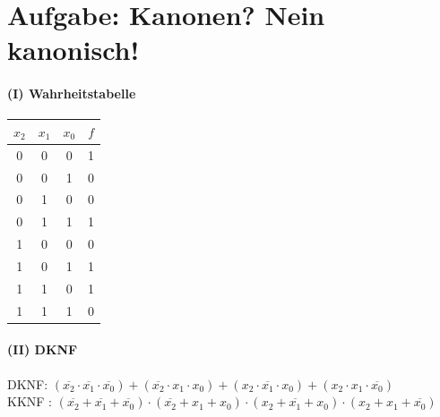 \documentclass[a4paper]{article}
\begin{document}
\section{Aufgabe: Kanonen? Nein kanonisch!}
\paragraph{(I) Wahrheitstabelle}
\begin{center}
\begin{tabular}{ c c c |c }
	$x_2$ & $x_1$ & $x_0$ & $f$\\
	\hline
	0& 0& 0 & 1\\ 
	0 & 0 & 1 & 0\\
	0 & 1 & 0 & 0\\
	0 & 1 & 1 & 1\\
	1 & 0 & 0 & 0\\
	1 & 0 & 1 & 1\\
	1 & 1 & 0 & 1\\
	1 & 1 & 1 & 0\\
\end{tabular}
\end{center}

\paragraph{(II) DKNF}
DKNF: $(\overline{x_2}\cdot\overline{x_1}\cdot\overline{x_0})+ (\overline{x_2}\cdot x_1\cdot x_0)+ (x_2\cdot\overline{x_1}\cdot x_0) + (x_2\cdot x_1\cdot\overline{x_0})$\\
KKNF : $(\overline{x_2}+\overline{x_1}+\overline{x_0})\cdot(\overline{x_2}+ x_1+ x_0)\cdot (x_2+\overline{x_1}+ x_0) \cdot (x_2+ x_1+\overline{x_0})$\\
\end{document}
